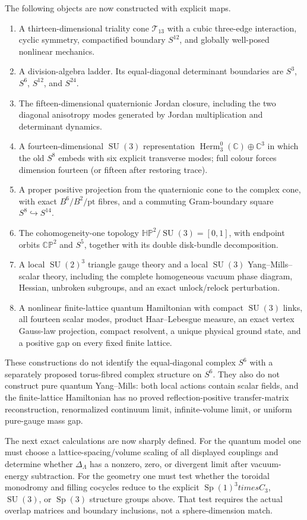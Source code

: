 \documentclass[11pt]{article}
\theoremstyle{definition}
\theoremstyle{remark}
\newcommand{\C}{\mathbb C}
\newcommand{\CP}{\mathbb{CP}}
\newcommand{\HP}{\mathbb{HP}}
\newcommand{\Herm}{\operatorname{Herm}}
\newcommand{\Sp}{\operatorname{Sp}}
\newcommand{\SU}{\operatorname{SU}}
\newcommand{\cT}{\mathcal T}
\begin{document}
The following objects are now constructed with explicit maps.
\begin{enumerate}
\item A thirteen-dimensional triality cone $\cT_{13}$ with a cubic three-edge interaction, cyclic symmetry, compactified boundary $S^{12}$, and globally well-posed nonlinear mechanics.
\item A division-algebra ladder.  Its equal-diagonal determinant boundaries are $S^3$, $S^6$, $S^{12}$, and $S^{24}$.
\item The fifteen-dimensional quaternionic Jordan closure, including the two diagonal anisotropy modes generated by Jordan multiplication and determinant dynamics.
\item A fourteen-dimensional $\SU(3)$ representation
$\Herm_3^0(\C)\oplus\C^3$ in which the old $S^8$ embeds with six explicit transverse modes; full colour forces dimension fourteen (or fifteen after restoring trace).
\item A proper positive projection from the quaternionic cone to the complex cone, with exact $B^6/B^2/\mathrm{pt}$ fibres, and a commuting Gram-boundary square $S^8\hookrightarrow S^{14}$.
\item The cohomogeneity-one topology
$\HP^2/\SU(3)=[0,1]$, with endpoint orbits $\CP^2$ and $S^5$, together with its double disk-bundle decomposition.
\item A local $\SU(2)^3$ triangle gauge theory and a local $\SU(3)$ Yang--Mills--scalar theory, including the complete homogeneous vacuum phase diagram, Hessian, unbroken subgroups, and an exact unlock/relock perturbation.
\item A nonlinear finite-lattice quantum Hamiltonian with compact $\SU(3)$ links, all fourteen scalar modes, product Haar--Lebesgue measure, an exact vertex Gauss-law projection, compact resolvent, a unique physical ground state, and a positive gap on every fixed finite lattice.
\end{enumerate}

These constructions do not identify the equal-diagonal complex $S^6$ with a separately proposed torus-fibred complex structure on $S^6$.  They also do not construct pure quantum Yang--Mills: both local actions contain scalar fields, and the finite-lattice Hamiltonian has no proved reflection-positive transfer-matrix reconstruction, renormalized continuum limit, infinite-volume limit, or uniform pure-gauge mass gap.

The next exact calculations are now sharply defined.  For the quantum model one must choose a lattice-spacing/volume scaling of all displayed couplings and determine whether $\Delta_\Lambda$ has a nonzero, zero, or divergent limit after vacuum-energy subtraction.  For the geometry one must test whether the toroidal monodromy and filling cocycles reduce to the explicit $\Sp(1)^3
times C_3$, $\SU(3)$, or $\Sp(3)$ structure groups above.  That test requires the actual overlap matrices and boundary inclusions, not a sphere-dimension match.
\end{document}
